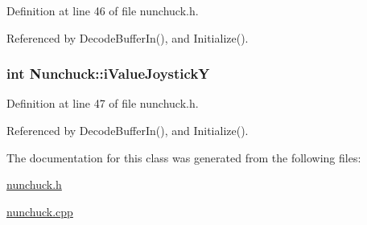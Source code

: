 Definition at line 46 of file nunchuck.\-h.



Referenced by Decode\-Buffer\-In(), and Initialize().

\hypertarget{classNunchuck_a0e084b1760acfc06305bbb339e3c8232}{
\subsubsection[{i\-Value\-Joystick\-Y}]{\setlength{\rightskip}{0pt plus 5cm}int Nunchuck\-::i\-Value\-Joystick\-Y}}\label{classNunchuck_a0e084b1760acfc06305bbb339e3c8232}


Definition at line 47 of file nunchuck.\-h.



Referenced by Decode\-Buffer\-In(), and Initialize().



The documentation for this class was generated from the following files\-:\begin{DoxyCompactItemize}
\item 
\hyperlink{nunchuck_8h}{nunchuck.\-h}\item 
\hyperlink{nunchuck_8cpp}{nunchuck.\-cpp}\end{DoxyCompactItemize}
